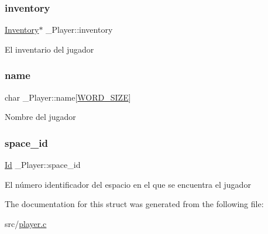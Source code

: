 \subsubsection{\texorpdfstring{inventory}{inventory}}
{\footnotesize\ttfamily \hyperlink{inventory_8h_a2253bf64ac4ce6a9c1d6f39c0b0d32a3}{Inventory}$\ast$ \+\_\+\+Player\+::inventory}

El inventario del jugador \mbox{\label{struct__Player_adda99df91c28eb58d392f2b43fc6898f}} 
\subsubsection{\texorpdfstring{name}{name}}
{\footnotesize\ttfamily char \+\_\+\+Player\+::name\mbox{[}\hyperlink{types_8h_a92ed8507d1cd2331ad09275c5c4c1c89}{W\+O\+R\+D\+\_\+\+S\+I\+ZE}\mbox{]}}

Nombre del jugador \mbox{\label{struct__Player_aed09e7001b0005d679224be84e98d2a8}} 
\subsubsection{\texorpdfstring{space\+\_\+id}{space\_id}}
{\footnotesize\ttfamily \hyperlink{types_8h_a845e604fb28f7e3d97549da3448149d3}{Id} \+\_\+\+Player\+::space\+\_\+id}

El número identificador del espacio en el que se encuentra el jugador 

The documentation for this struct was generated from the following file\+:\begin{DoxyCompactItemize}
\item 
src/\hyperlink{player_8c}{player.\+c}\end{DoxyCompactItemize}
